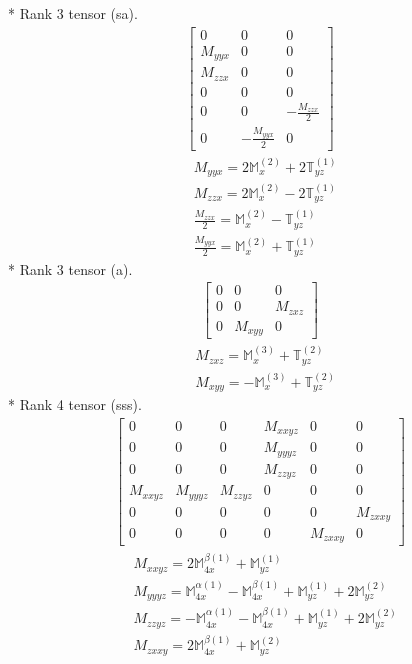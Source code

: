\documentclass[fleqn,8pt,landscape]{jsarticle}
\begin{document}
* Rank 3 tensor (sa).
\begin{align*}
\begin{bmatrix} 0 & 0 & 0 \\ M_{yyx} & 0 & 0 \\ M_{zzx} & 0 & 0 \\ 0 & 0 & 0 \\ 0 & 0 & - \frac{M_{zzx}}{2} \\ 0 & - \frac{M_{yyx}}{2} & 0 \end{bmatrix}
\end{align*}
\begin{align*}
& M_{yyx} = 2 \mathbb{M}_{x}^{(2)} + 2 \mathbb{T}_{yz}^{(1)} \\
& M_{zzx} = 2 \mathbb{M}_{x}^{(2)} - 2 \mathbb{T}_{yz}^{(1)} \\
& \frac{M_{zzx}}{2} = \mathbb{M}_{x}^{(2)} - \mathbb{T}_{yz}^{(1)} \\
& \frac{M_{yyx}}{2} = \mathbb{M}_{x}^{(2)} + \mathbb{T}_{yz}^{(1)}
\end{align*}
* Rank 3 tensor (a).
\begin{align*}
\begin{bmatrix} 0 & 0 & 0 \\ 0 & 0 & M_{zxz} \\ 0 & M_{xyy} & 0 \end{bmatrix}
\end{align*}
\begin{align*}
& M_{zxz} = \mathbb{M}_{x}^{(3)} + \mathbb{T}_{yz}^{(2)} \\
& M_{xyy} = - \mathbb{M}_{x}^{(3)} + \mathbb{T}_{yz}^{(2)}
\end{align*}
* Rank 4 tensor (sss).
\begin{align*}
\begin{bmatrix} 0 & 0 & 0 & M_{xxyz} & 0 & 0 \\ 0 & 0 & 0 & M_{yyyz} & 0 & 0 \\ 0 & 0 & 0 & M_{zzyz} & 0 & 0 \\ M_{xxyz} & M_{yyyz} & M_{zzyz} & 0 & 0 & 0 \\ 0 & 0 & 0 & 0 & 0 & M_{zxxy} \\ 0 & 0 & 0 & 0 & M_{zxxy} & 0 \end{bmatrix}
\end{align*}
\begin{align*}
& M_{xxyz} = 2 \mathbb{M}_{4x}^{\beta(1)} + \mathbb{M}_{yz}^{(1)} \\
& M_{yyyz} = \mathbb{M}_{4x}^{\alpha(1)} - \mathbb{M}_{4x}^{\beta(1)} + \mathbb{M}_{yz}^{(1)} + 2 \mathbb{M}_{yz}^{(2)} \\
& M_{zzyz} = - \mathbb{M}_{4x}^{\alpha(1)} - \mathbb{M}_{4x}^{\beta(1)} + \mathbb{M}_{yz}^{(1)} + 2 \mathbb{M}_{yz}^{(2)} \\
& M_{zxxy} = 2 \mathbb{M}_{4x}^{\beta(1)} + \mathbb{M}_{yz}^{(2)}
\end{align*}
\end{document}

